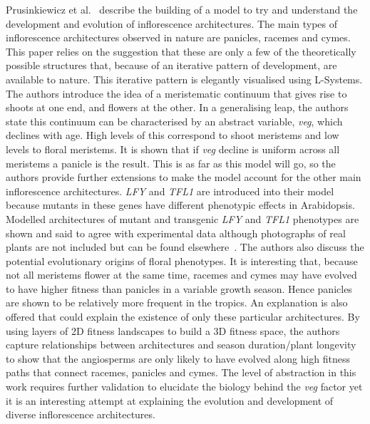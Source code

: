Prusinkiewicz et al.~\cite{prusinkiewicz2007} describe the building of a model to try and understand the development and evolution of inflorescence architectures.
The main types of inflorescence architectures observed in nature are panicles, racemes and cymes.
This paper relies on the suggestion that these are only a few of the theoretically possible structures that, because of an iterative pattern of development, are available to nature.
This iterative pattern is elegantly visualised using L-Systems.
The authors introduce the idea of a meristematic continuum that gives rise to shoots at one end, and flowers at the other.
In a generalising leap, the authors state this continuum can be characterised by an abstract variable, \emph{veg}, which declines with age.
High levels of this correspond to shoot meristems and low levels to floral meristems.
It is shown that if \emph{veg} decline is uniform across all meristems a panicle is the result.
This is as far as this model will go, so the authors provide further extensions to make the model account for the other main inflorescence architectures.
\emph{LFY} and \emph{TFL1} are introduced into their model because mutants in these genes have different phenotypic effects in Arabidopsis.
Modelled architectures of mutant and transgenic \emph{LFY} and \emph{TFL1} phenotypes are shown and said to agree with experimental data although photographs of real plants are not included but can be found elsewhere~\cite{ratcliffe1998,ratcliffe1999}.
The authors also discuss the potential evolutionary origins of floral phenotypes.
It is interesting that, because not all meristems flower at the same time, racemes and cymes may have evolved to have higher fitness than panicles in a variable growth season.
Hence panicles are shown to be relatively more frequent in the tropics.
An explanation is also offered that could explain the existence of only these particular architectures.
By using layers of 2D fitness landscapes to build a 3D fitness space, the authors capture relationships between architectures and season duration/plant longevity to show that the angiosperms are only likely to have evolved along high fitness paths that connect racemes, panicles and cymes.
The level of abstraction in this work requires further validation to elucidate the biology behind the \emph{veg} factor yet it is an interesting attempt at explaining the evolution and development of diverse inflorescence architectures.

